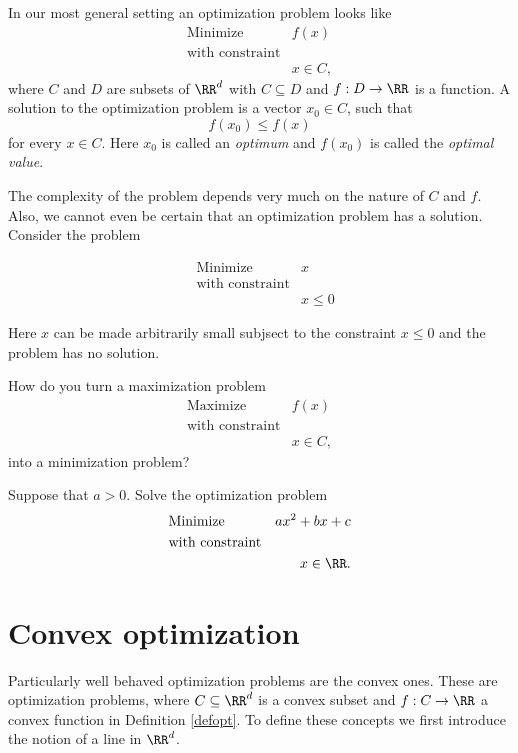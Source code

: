 \documentclass{article}
\begin{document}
\begin{definition}[emph]\label{defopt}
  In our most general setting an optimization problem looks like
\begin{align*}
  &\text{Minimize} &f(x)&\\
  &\text{with constraint}\\
  &&x\in C,
\end{align*}
     where $C$ and $D$ are subsets of $\RR^d$ with $C\subseteq D$ and $f: D\rightarrow \RR$ is a function.
A solution to the optimization problem is a vector $x_0\in C$, such that
$$
f(x_0) \leq f(x)
$$
for every $x\in C$. Here $x_0$ is called an \emph{optimum} and $f(x_0)$ is called the \emph{optimal value}.
\end{definition}

  The complexity of the problem depends very much on the nature of $C$ and $f$. Also,
  we cannot even be certain that an optimization problem has a solution. Consider
  the problem

  \begin{align*}
    &\text{Minimize} &x\\
    &\text{with constraint}\\
    &&x\leq 0
  \end{align*}

  Here $x$ can be made arbitrarily small subjsect to the constraint $x\leq 0$ and
  the problem has no solution.

  \beginshex
    How do you turn a maximization problem
\begin{align*}
  &\text{Maximize} &f(x)&\\
  &\text{with constraint}\\
  &&x\in C,
\end{align*}
    into a minimization problem?
    \endshex


    \beginshex\label{mothercopt}
    Suppose that $a > 0$. Solve the optimization problem
\begin{align*}
    &\text{Minimize} &a x^2 + b x + c\\
    &\text{with constraint}\\
    &&x\in \RR.
  \end{align*}
    
    \endshex

    \section{Convex optimization}

    Particularly well behaved optimization problems are the convex ones. These are optimization
    problems, where $C\subseteq \RR^d$ is a convex subset and $f:C\rightarrow \RR$ a
    convex function in Definition \ref{defopt}. To define these concepts we first introduce
    the notion of 
    a line in $\RR^d$.
\end{document}
